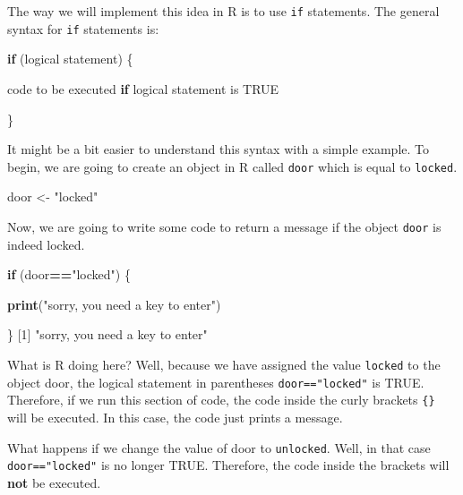\documentclass[
]{book}
\newenvironment{Shaded}{\begin{snugshade}}{\end{snugshade}}
\newcommand{\ConstantTok}[1]{\textcolor[rgb]{0.56,0.35,0.01}{#1}}
\newcommand{\ControlFlowTok}[1]{\textcolor[rgb]{0.13,0.29,0.53}{\textbf{#1}}}
\newcommand{\DecValTok}[1]{\textcolor[rgb]{0.00,0.00,0.81}{#1}}
\newcommand{\FunctionTok}[1]{\textcolor[rgb]{0.13,0.29,0.53}{\textbf{#1}}}
\newcommand{\NormalTok}[1]{#1}
\newcommand{\OtherTok}[1]{\textcolor[rgb]{0.56,0.35,0.01}{#1}}
\newcommand{\SpecialCharTok}[1]{\textcolor[rgb]{0.81,0.36,0.00}{\textbf{#1}}}
\newcommand{\StringTok}[1]{\textcolor[rgb]{0.31,0.60,0.02}{#1}}
\begin{document}
The way we will implement this idea in R is to use \texttt{if} statements. The general syntax for \texttt{if} statements is:

\begin{Shaded}
\begin{Highlighting}[]
\ControlFlowTok{if}\NormalTok{ (logical statement) \{}
  
\NormalTok{  code to be executed }\ControlFlowTok{if}\NormalTok{ logical statement is }\ConstantTok{TRUE}
  
\NormalTok{\}}
\end{Highlighting}
\end{Shaded}

It might be a bit easier to understand this syntax with a simple example. To begin, we are going to create an object in R called \texttt{door} which is equal to \texttt{locked}.

\begin{Shaded}
\begin{Highlighting}[]
\NormalTok{door }\OtherTok{\textless{}{-}} \StringTok{"locked"}
\end{Highlighting}
\end{Shaded}

Now, we are going to write some code to return a message if the object \texttt{door} is indeed locked.

\begin{Shaded}
\begin{Highlighting}[]
\ControlFlowTok{if}\NormalTok{ (door}\SpecialCharTok{==}\StringTok{"locked"}\NormalTok{) \{}
  
  \FunctionTok{print}\NormalTok{(}\StringTok{"sorry, you need a key to enter"}\NormalTok{)}
  
\NormalTok{\}}
\NormalTok{[}\DecValTok{1}\NormalTok{] }\StringTok{"sorry, you need a key to enter"}
\end{Highlighting}
\end{Shaded}

What is R doing here? Well, because we have assigned the value \texttt{locked} to the object door, the logical statement in parentheses \texttt{door=="locked"} is TRUE. Therefore, if we run this section of code, the code inside the curly brackets \texttt{\{\}} will be executed. In this case, the code just prints a message.

What happens if we change the value of door to \texttt{unlocked}. Well, in that case \texttt{door=="locked"} is no longer TRUE. Therefore, the code inside the brackets will \textbf{not} be executed.
\end{document}

